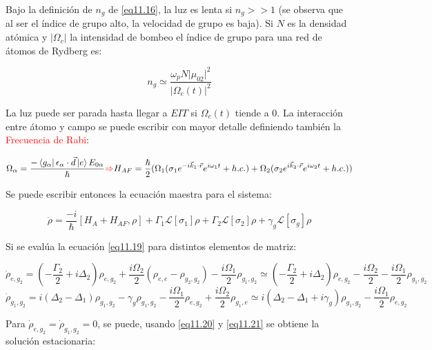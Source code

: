 \documentclass{book}
\begin{document}
Bajo la definición de $n_g$ de \ref{eq11.16}, la luz es lenta si $n_g >>1$ (se observa que al ser el índice de grupo alto, la velocidad de grupo es baja). Si $N$ es la densidad atómica y $\lvert \Omega_c\rvert$ la intensidad de bombeo el índice de grupo para una red de átomos de Rydberg es:

\begin{equation}\label{eq11.17}n_g\simeq \frac{\omega_p N\lvert\mu_{02}\rvert^2}{\lvert\Omega_c(t)\rvert^2}\end{equation}

La luz puede ser parada hasta llegar a $EIT$ si $\Omega_c(t)$ tiende a 0. La interacción entre átomo y campo se puede escribir con mayor detalle definiendo también la \textcolor{red}{Frecuencia de Rabi}:

\begin{equation}\label{eq11.18}\Omega_\alpha=\frac{-\bra{g_\alpha}\epsilon_\alpha\cdot\vec{d}\ket{e}E_{0\alpha}}{\hslash}\textcolor{red}{\Rightarrow} H_{AF}=\frac{\hslash}{2}(\Omega_1(\sigma_1e^{-i\vec{k}_1\cdot\vec{r}}e^{i\omega_1 t}+h.c.)+\Omega_2(\sigma_2e^{i\vec{k}_2\cdot\vec{r}}e^{i\omega_2 t}+h.c.))\end{equation}

Se puede escribir entonces la ecuación maestra para el sistema:

\begin{equation}\label{eq11.19}\dot{\rho}=\frac{-i}{\hslash}[H_A+H_{AF},\rho]+\Gamma_1\mathcal{L}[\sigma_1]\rho+\Gamma_2\mathcal{L}[\sigma_2]\rho+\gamma_g\mathcal{L}[\sigma_g]\rho\end{equation}

Si se evalúa  la ecuación \ref{eq11.19} para distintos elementos de matriz:

\begin{equation}\label{eq11.20}\dot{\rho}_{e,g_2}=(-\frac{\Gamma_2}{2}+i\Delta_2)\rho_{e,g_2}+\frac{i\Omega_2}{2}(\rho_{e,e}-\rho_{g_2,g_2})-\frac{i\Omega_1}{2}\rho_{g_1,g_2}\simeq(-\frac{\Gamma_2}{2}+i\Delta_2)\rho_{e,g_2}-\frac{i\Omega_2}{2}-\frac{i\Omega_1}{2}\rho_{g_1,g_2}\end{equation}
\begin{equation}\label{eq11.21}\dot{\rho}_{g_1,g_2}=i(\Delta_2-\Delta_1)\rho_{g_1,g_2}-\gamma_g\rho_{g_1,g_2}-\frac{i\Omega_1}{2}\rho_{e,g_2}+\frac{i\Omega_2}{2}\rho_{g_1,e}\simeq i(\Delta_2-\Delta_1+i\gamma_g)\rho_{g_1,g_2}-\frac{i\Omega_1}{2}\rho_{e,g_2}\end{equation}

Para $\dot{\rho}_{e,g_2}=\dot{\rho}_{g_1,g_2}=0$, se puede, usando \ref{eq11.20} y \ref{eq11.21} se obtiene la solución estacionaria:
\end{document}
